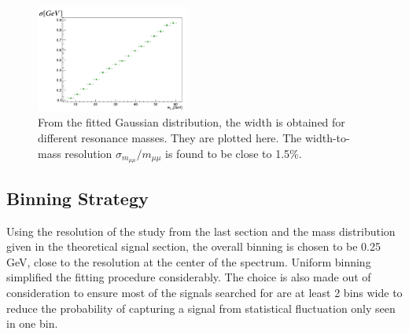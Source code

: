 \begin{figure}[!htb]
    \begin{center}
    \includegraphics[width=0.45\textwidth]{figures/chapter_dimuon/sigma}        
    \caption{
        From the fitted Gaussian distribution, the width is obtained for different resonance masses. They are plotted here. The width-to-mass resolution $\sigma_{m_{\mu\mu}}/m_{\mu\mu}$ is found to be close to 1.5\%.}
    \label{fig:sigma}
    \end{center}
\end{figure}
\FloatBarrier


\subsection{Binning Strategy}
\label{sec:binningresult}
Using the resolution of the study from the last section and the mass distribution given in the theoretical signal section, the overall binning is chosen to be 0.25 GeV, close to the resolution at the center of the spectrum. Uniform binning simplified the fitting procedure considerably. The choice is also made out of consideration to ensure most of the signals searched for are at least 2 bins wide to reduce the probability of capturing a signal from statistical fluctuation only seen in one bin.

%


